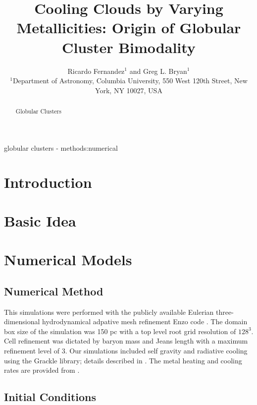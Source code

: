 \documentclass[useAMS,usenatbib]{mn2e}
\title{Cooling Clouds by Varying Metallicities: Origin of Globular Cluster Bimodality}
\author[R. Fernandez et al.]{Ricardo Fernandez$^{1}$ and Greg L. Bryan$^{1}$\\
$^{1}$Department of Astronomy, Columbia University, 550 West 120th Street, New York, NY 10027, USA}
\begin{document}
\date{}


\maketitle


\begin{abstract}
Globular Clusters
\end{abstract}

\begin{keywords}
globular clusters - methods:numerical
\end{keywords}

%
\section{Introduction}

%
\section{Basic Idea}
\label{sec:basic}

%
\section{Numerical Models}
\label{sec:numerical}
\subsection{Numerical Method}
This simulations were performed with the publicly available Eulerian three-dimensional
hydrodynamical adpative mesh refinement Enzo code \citep{Bryan2013}. The domain
box size of the simulation was 150 pc with a top level root grid resolution of $128^3$.
Cell refinement was dictated by baryon mass and Jeans length with a maximum refinement
level of 3. Our simulations included self gravity and radiative cooling using the
Grackle library; details described in \cite{Bryan2013}. The metal heating and
cooling rates are provided from \cite{Haardt2012}.

\subsection{Initial Conditions}
\end{document}
